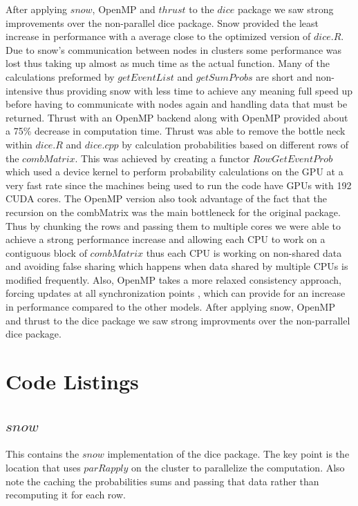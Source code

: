 \documentclass[12pt]{article}
\begin{document}
After applying $snow$, OpenMP and $thrust$ to the $dice$ package we saw strong improvements over the non-parallel dice package. Snow provided the
least increase in performance with a average close to the optimized version of $dice.R$. Due to snow's communication between nodes in clusters 
some performance was lost thus taking up almost as much time as the actual function. Many of the calculations preformed by $getEventList$ and $getSumProbs$
are short and non-intensive thus providing snow with less time to achieve any meaning full speed up before having to communicate with nodes again and handling 
data that must be returned. Thrust with an OpenMP backend along with OpenMP provided about a 75\% decrease in computation time. Thrust was able to
remove the bottle neck within $dice.R$ and $dice.cpp$ by calculation probabilities based on different rows of the $combMatrix$. This was achieved by 
creating a functor $RowGetEventProb$ which used a device kernel to perform probability calculations on the GPU at a very fast rate since the machines 
being used to run the code have GPUs with 192 CUDA cores. The OpenMP version also took advantage of the fact that the recursion on the combMatrix was the
main bottleneck for the original package. Thus by chunking the rows and passing them to multiple cores we were able to achieve a strong performance increase
and allowing each CPU to work on a contiguous block of $combMatrix$ thus each CPU is working on non-shared data and avoiding false sharing which happens 
when data shared by multiple CPUs is modified frequently. Also, OpenMP takes a more relaxed consistency approach, forcing updates at all synchronization points
\cite{matloff_parallel}, which can provide for an increase in performance compared to the other models. After applying snow, OpenMP and thrust to the dice 
package we saw strong improvments over the non-parrallel dice package.

\appendix

\section{Code Listings}

\subsection{$snow$}

This contains the $snow$ implementation of the dice package. The key point is the location that uses $parRapply$ on the cluster to parallelize the computation. Also note the caching the probabilities sums and passing that data rather than recomputing it for each row.
\end{document}
